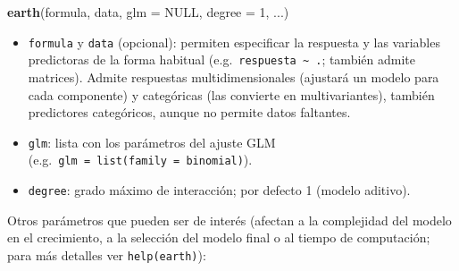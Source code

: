 \documentclass[
  spanish,
]{book}
\newenvironment{Shaded}{\begin{snugshade}}{\end{snugshade}}
\newcommand{\DataTypeTok}[1]{\textcolor[rgb]{0.13,0.29,0.53}{#1}}
\newcommand{\DecValTok}[1]{\textcolor[rgb]{0.00,0.00,0.81}{#1}}
\newcommand{\KeywordTok}[1]{\textcolor[rgb]{0.13,0.29,0.53}{\textbf{#1}}}
\newcommand{\NormalTok}[1]{#1}
\newcommand{\OtherTok}[1]{\textcolor[rgb]{0.56,0.35,0.01}{#1}}
\theoremstyle{break}
\theoremstyle{definition}
\theoremstyle{definition}
\theoremstyle{definition}
\theoremstyle{remark}
\begin{document}
\begin{Shaded}
\begin{Highlighting}[]
\KeywordTok{earth}\NormalTok{(formula, data, }\DataTypeTok{glm =} \OtherTok{NULL}\NormalTok{, }\DataTypeTok{degree =} \DecValTok{1}\NormalTok{, ...) }
\end{Highlighting}
\end{Shaded}

\begin{itemize}
\item
  \texttt{formula} y \texttt{data} (opcional): permiten especificar la respuesta y las variables predictoras de la forma habitual (e.g.~\texttt{respuesta\ \textasciitilde{}\ .}; también admite matrices). Admite respuestas multidimensionales (ajustará un modelo para cada componente) y categóricas (las convierte en multivariantes), también predictores categóricos, aunque no permite datos faltantes.
\item
  \texttt{glm}: lista con los parámetros del ajuste GLM (e.g.~\texttt{glm\ =\ list(family\ =\ binomial)}).
\item
  \texttt{degree}: grado máximo de interacción; por defecto 1 (modelo aditivo).
\end{itemize}

Otros parámetros que pueden ser de interés (afectan a la complejidad del modelo en el crecimiento, a la selección del modelo final o al tiempo de computación; para más detalles ver \texttt{help(earth)}):
\end{document}
